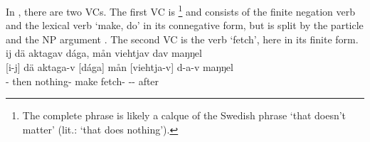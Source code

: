 In , there are two VCs. The first VC is %
\footnote{The complete phrase  is likely a calque of the Swedish phrase  ‘that doesn’t matter’ (lit.: ‘that does nothing’).} %
and consists of the finite negation verb and the lexical verb  ‘make, do’ in its connegative form, but is split by the particle  and the NP argument . The second VC is the verb  ‘fetch’, here in its  finite form. 
\ea\label{VCex3}
\glll	ij dä aktagav dága, mån viehtjav dav maŋŋel\\
	{[i-j]\subVC{}} dä aktaga-v {[dága]\subVC{}} mån {[viehtja-v]\subVC{}} d-a-v maŋŋel\\
	- then nothing- make\BS{}  fetch- -- after\\\nopagebreak
{}	
\z

